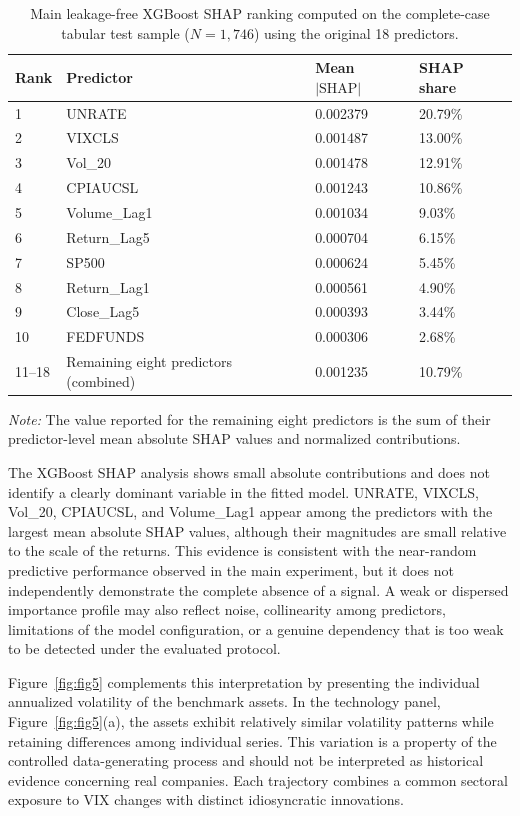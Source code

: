 \documentclass[utf8]{FrontiersinHarvard} %
\begin{document}
\begin{table}[h]
	\caption{Main leakage-free XGBoost SHAP ranking computed on the complete-case tabular test sample (\(N=1{,}746\)) using the original 18 predictors.}
	\label{tab:main_xgb_shap}
	\setlength{\tabcolsep}{4pt}
	\centering
	\begin{tabular}{p{35pt}p{185pt}p{105pt}p{85pt}}
		\hline
		\textbf{Rank} & \textbf{Predictor} & \textbf{Mean \(|\mathrm{SHAP}|\)} & \textbf{SHAP share} \\
		\hline
		1 & UNRATE & 0.002379 & 20.79\% \\
		2 & VIXCLS & 0.001487 & 13.00\% \\
		3 & Vol\_20 & 0.001478 & 12.91\% \\
		4 & CPIAUCSL & 0.001243 & 10.86\% \\
		5 & Volume\_Lag1 & 0.001034 & 9.03\% \\
		6 & Return\_Lag5 & 0.000704 & 6.15\% \\
		7 & SP500 & 0.000624 & 5.45\% \\
		8 & Return\_Lag1 & 0.000561 & 4.90\% \\
		9 & Close\_Lag5 & 0.000393 & 3.44\% \\
		10 & FEDFUNDS & 0.000306 & 2.68\% \\
		11--18 &Remaining eight predictors (combined) & 0.001235 & 10.79\% \\
		\hline
	\end{tabular}
	\noindent\footnotesize{\textit{Note:} The value reported for the remaining eight predictors is the sum of their predictor-level mean absolute SHAP values and normalized contributions.}
\end{table}

The XGBoost SHAP analysis shows small absolute contributions and does not identify a clearly dominant variable in the fitted model. UNRATE, VIXCLS, Vol\_20, CPIAUCSL, and Volume\_Lag1 appear among the predictors with the largest mean absolute SHAP values, although their magnitudes are small relative to the scale of the returns. This evidence is consistent with the near-random predictive performance observed in the main experiment, but it does not independently demonstrate the complete absence of a signal. A weak or dispersed importance profile may also reflect noise, collinearity among predictors, limitations of the model configuration, or a genuine dependency that is too weak to be detected under the evaluated protocol.

Figure~\ref{fig:fig5} complements this interpretation by presenting the individual annualized volatility of the benchmark assets. In the technology panel, Figure~\ref{fig:fig5}(a), the assets exhibit relatively similar volatility patterns while retaining differences among individual series. This variation is a property of the controlled data-generating process and should not be interpreted as historical evidence concerning real companies. Each trajectory combines a common sectoral exposure to VIX changes with distinct idiosyncratic innovations.
\end{document}
